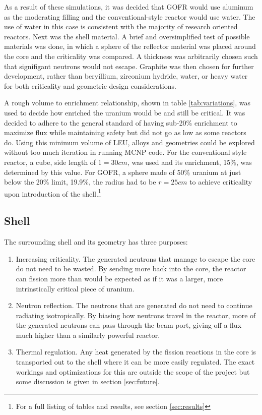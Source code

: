 As a result of these simulations, it was decided that GOFR would use aluminum as the moderating filling and the conventional-style reactor would use water. The use of water in this case is consistent with the majority of research oriented reactors. Next was the shell material. A brief and oversimplified test of possible materials was done, in which a sphere of the reflector material was placed around the core and the criticality was compared. A thickness was arbitrarily chosen such that signifigant neutrons would not escape. Graphite was then chosen for further development, rather than beryillium, zirconium hydride, water, or heavy water for both criticality and geometric design considerations.

A rough volume to enrichment relationship, shown in table \ref{tab:variations}, was used to decide how enriched the uranium would be and still be critical. It was decided to adhere to the general standard of having sub-20\% enrichment to maximize flux while maintaining safety but did not go as low as some reactors do. Using this minimum volume of LEU, alloys and geometries could be explored without too much iteration in running MCNP code. For the conventional style reactor, a cube, side length of $1=30cm$, was used and its enrichment, 15\%, was determined by this value. For GOFR, a sphere made of 50\% uranium at just below the 20\% limit, 19.9\%, the radius had to be $r=25cm$ to achieve criticality upon introduction of the shell.\footnote{For a full listing of tables and results, see section \ref{sec:results}}

\subsection{Shell}

The surrounding shell and its geometry has three purposes:

\begin{enumerate}
	\item Increasing criticality.
	The generated neutrons that manage to escape the core do not need to be wasted. By sending more back into the core, the reactor can fission more than would be expected as if it was a larger, more intrinstically critical piece of uranium.
	\item Neutron reflection.
	The neutrons that are generated do not need to continue radiating isotropically. By biasing how neutrons travel in the reactor, more of the generated neutrons can pass through the beam port, giving off a flux much higher than a similarly powerful reactor.
	\item Thermal regulation.
	Any heat generated by the fission reactions in the core is transported out to the shell where it can be more easily regulated. The exact workings and optimizations for this are outside the scope of the project but some discussion is given in section \ref{sec:future}.
\end{enumerate}

